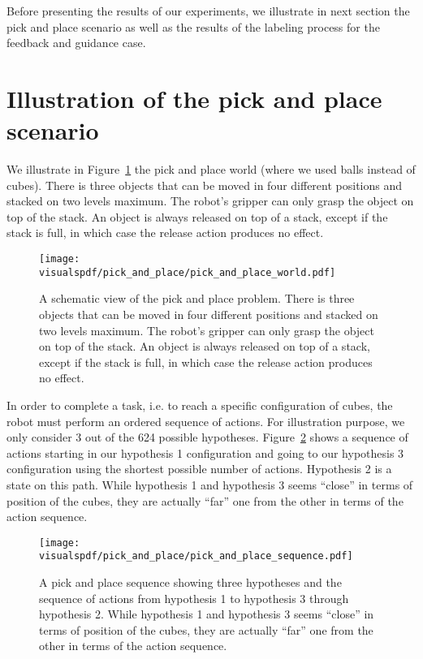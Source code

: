 Before presenting the results of our experiments, we illustrate in next section the pick and place scenario as well as the results of the labeling process for the feedback and guidance case.

\section{Illustration of the pick and place scenario}
\label{chapter:lfui:pickplace}

We illustrate in Figure~\ref{fig:lfui:pickplaceworld} the pick and place world (where we used balls instead of cubes). There is three objects that can be moved in four different positions and stacked on two levels maximum. The robot's gripper can only grasp the object on top of the stack. An object is always released on top of a stack, except if the stack is full, in which case the release action produces no effect.

\begin{figure}[!htbp]
  \centering
  \texttt{[image: \\visualspdf/pick\_and\_place/pick\_and\_place\_world.pdf]}
  \caption{A schematic view of the pick and place problem. There is three objects that can be moved in four different positions and stacked on two levels maximum. The robot's gripper can only grasp the object on top of the stack. An object is always released on top of a stack, except if the stack is full, in which case the release action produces no effect.}
  \label{fig:lfui:pickplaceworld}
\end{figure}

In order to complete a task, i.e. to reach a specific configuration of cubes, the robot must perform an ordered sequence of actions. For illustration purpose, we only consider 3 out of the 624 possible hypotheses. Figure~\ref{fig:lfui:pickplacesequence} shows a sequence of actions starting in our hypothesis 1 configuration and going to our hypothesis 3 configuration using the shortest possible number of actions. Hypothesis 2 is a state on this path. While hypothesis 1 and hypothesis 3 seems ``close'' in terms of position of the cubes, they are actually ``far'' one from the other in terms of the action sequence.

\begin{figure}[!htbp]
  \centering
  \texttt{[image: \\visualspdf/pick\_and\_place/pick\_and\_place\_sequence.pdf]}
  \caption{A pick and place sequence showing three hypotheses and the sequence of actions from hypothesis 1 to hypothesis 3 through hypothesis 2. While hypothesis 1 and hypothesis 3 seems ``close'' in terms of position of the cubes, they are actually ``far'' one from the other in terms of the action sequence.}
  \label{fig:lfui:pickplacesequence}
\end{figure}

